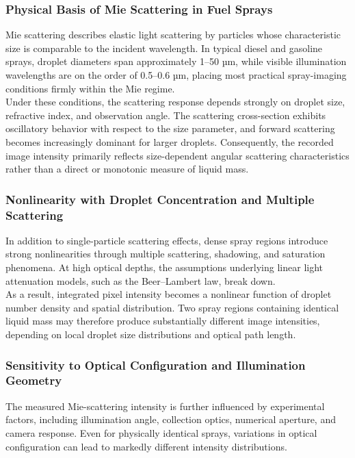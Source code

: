 \documentclass[english, 12pt, a4paper, elec, utf8, a-2b, online]{aaltothesis}
\begin{document}
\subsubsection{Physical Basis of Mie Scattering in Fuel Sprays}

Mie scattering describes elastic light scattering by particles whose characteristic size is comparable to the incident wavelength. In typical diesel and gasoline sprays, droplet diameters span approximately 1–50 µm, while visible illumination wavelengths are on the order of 0.5–0.6 µm, placing most practical spray-imaging conditions firmly within the Mie regime.\\

Under these conditions, the scattering response depends strongly on droplet size, refractive index, and observation angle. The scattering cross-section exhibits oscillatory behavior with respect to the size parameter, and forward scattering becomes increasingly dominant for larger droplets. Consequently, the recorded image intensity primarily reflects size-dependent angular scattering characteristics rather than a direct or monotonic measure of liquid mass.\\

\subsubsection{Nonlinearity with Droplet Concentration and Multiple Scattering}

In addition to single-particle scattering effects, dense spray regions introduce strong nonlinearities through multiple scattering, shadowing, and saturation phenomena. At high optical depths, the assumptions underlying linear light attenuation models, such as the Beer–Lambert law, break down.\\

As a result, integrated pixel intensity becomes a nonlinear function of droplet number density and spatial distribution. Two spray regions containing identical liquid mass may therefore produce substantially different image intensities, depending on local droplet size distributions and optical path length.\\

\subsubsection{Sensitivity to Optical Configuration and Illumination Geometry}

The measured Mie-scattering intensity is further influenced by experimental factors, including illumination angle, collection optics, numerical aperture, and camera response. Even for physically identical sprays, variations in optical configuration can lead to markedly different intensity distributions.\\
\end{document}
